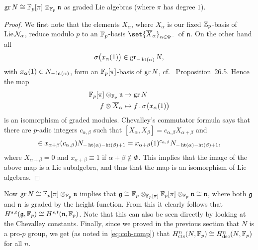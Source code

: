 \begin{lemma}
  $\operatorname{gr} N \cong \mathbb{F}_{p}[\pi] \otimes_{\mathbb{F}_{p}} \mathfrak{n}$ as graded Lie algebras (where $\pi$ has degree $1$).
\end{lemma}
\begin{proof}
  We first note that the elements $X_{\alpha}$, where $X_{\alpha}$ is our fixed $\mathbb{Z}_{p}$-basis of $\operatorname{Lie} \mathcal{N}_{\alpha}$, reduce modulo $p$ to an $\mathbb{F}_{p}$-basis $\set{\overline{X}_{\alpha}}_{\alpha \in \Phi^{-}}$ of $\mathfrak{n}$. On the other hand all
  \begin{equation*}
    \sigma\bigl(x_{\alpha}(1)\bigr) \in \operatorname{gr}_{-\operatorname{ht}(\alpha)} N,
  \end{equation*}
  with $x_{\alpha}(1) \in N_{-\operatorname{ht}(\alpha)}$, form an $\mathbb{F}_{p}[\pi]$-basis of $\operatorname{gr} N$, cf.\ \cite{Sch} Proposition~26.5. Hence the map
  \begin{align*}
    \mathbb{F}_{p}[\pi] \otimes_{\mathbb{F}_{p}} \mathfrak{n} &\to \operatorname{gr} N \\
    f \otimes \overline{X}_{\alpha} &\mapsto f \,.\, \sigma\bigl(x_{\alpha}(1)\bigr)
  \end{align*}
  is an isomorphism of graded modules.  Chevalley's commutator formula says that there are $p$-adic integers $c_{\alpha,\beta}$ such that $[X_{\alpha},X_{\beta}] = c_{\alpha,\beta}X_{\alpha+\beta}$ and
  \begin{equation*}
    [x_{\alpha}(1),x_{\beta}(1)] \in x_{\alpha+\beta}(c_{\alpha,\beta})N_{-\Ht(\alpha)-\Ht(\beta)+1} = x_{\alpha+\beta}(1)^{c_{\alpha,\beta}}N_{-\Ht(\alpha)-\Ht(\beta)+1},
  \end{equation*}
  where $X_{\alpha+\beta} = 0$ and $x_{\alpha+\beta} \equiv 1$ if $\alpha+\beta \notin \Phi$. This implies that the image of the above map is a Lie subalgebra, and thus that the map is an isomorphism of Lie algebras.
\end{proof}

Now $\operatorname{gr} N \cong \mathbb{F}_p[\pi] \otimes_{\mathbb{F}_p} \mathfrak{n}$ implies that $\mathfrak{g} \cong \mathbb{F}_p \otimes_{\mathbb{F}_p[\pi]} \mathbb{F}_p[\pi] \otimes_{\mathbb{F}_p} \mathfrak{n} \cong \mathfrak{n}$, where both $\mathfrak{g}$ and $\mathfrak{n}$ is graded by the height function. From this it clearly follows that $H^{s,t}(\mathfrak{g},\mathbb{F}_{p}) \cong H^{s,t}(\mathfrak{n},\mathbb{F}_{p})$. Note that this can also be seen directly by looking at the Chevalley constants. Finally, since we proved in the previous section that $N$ is a pro-$p$ group, we get (as noted in \eqref{eq:coh-comp}) that $H_{\mathrm{cts}}^{n}(N,\mathbb{F}_{p}) \cong H_{\mathrm{dsc}}^{n}(N,\mathbb{F}_{p})$ for all $n$.

